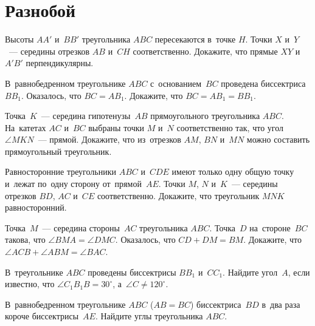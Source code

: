
\section*{Разнобой}


\begin{problems}

\item
Высоты $AA'$ и~$BB'$ треугольника $ABC$ пересекаются в~точке $H$.
Точки $X$ и~$Y$~--- середины отрезков $AB$ и~$CH$ соответственно.
Докажите, что прямые $XY$ и~$A'B'$ перпендикулярны.

\item
В~равнобедренном треугольнике $ABC$ с~основанием~$BC$ проведена
биссектриса~$B B_1$.
Оказалось, что $B C = A B_1$.
Докажите, что $B C = A B_1 = B B_1$.

\item
Точка~$K$~--- середина гипотенузы~$AB$ прямоугольного треугольника $ABC$.
На~катетах $AC$ и~$BC$ выбраны точки $M$ и~$N$ соответственно так, что угол
$\angle MKN$~--- прямой.
Докажите, что из~отрезков $AM$, $BN$ и~$MN$ можно составить прямоугольный
треугольник.

\item
Равносторонние треугольники $ABC$ и~$CDE$ имеют только одну общую точку и~лежат
по~одну сторону от~прямой~$AE$.
Точки $M$, $N$ и~$K$~--- середины отрезков $BD$, $AC$ и~$CE$ соответственно.
Докажите, что треугольник $MNK$ равносторонний.

\item
Точка~$M$~--- середина стороны~$AC$ треугольника $ABC$.
Точка~$D$ на~стороне~$BC$ такова, что $\angle BMA = \angle DMC$.
Оказалось, что $CD + DM = BM$.
Докажите, что $\angle ACB + \angle ABM = \angle BAC$.

\item
В~треугольнике $ABC$ проведены биссектрисы $B B_1$ и~$C C_1$.
Найдите угол~$A$, если известно, что $\angle C_1 B_1 B = 30^{\circ}$,
а~$\angle C \neq 120^{\circ}$.

\item
В~равнобедренном треугольнике $ABC$ ($AB = BC$) биссектриса~$BD$ в~два раза
короче биссектрисы~$AE$.
Найдите углы треугольника $ABC$.

\end{problems}

